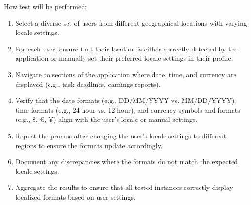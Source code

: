 \documentclass[12pt, titlepage]{article}
\begin{document}
\begin{enumerate}
How test will be performed:
\begin{enumerate}
    \item Select a diverse set of users from different geographical locations with varying locale settings.
    \item For each user, ensure that their location is either correctly detected by the application or manually set their preferred locale settings in their profile.
    \item Navigate to sections of the application where date, time, and currency are displayed (e.g., task deadlines, earnings reports).
    \item Verify that the date formats (e.g., DD/MM/YYYY vs. MM/DD/YYYY), time formats (e.g., 24-hour vs. 12-hour), and currency symbols and formats (e.g., \$, €, ¥) align with the user's locale or manual settings.
    \item Repeat the process after changing the user's locale settings to different regions to ensure the formats update accordingly.
    \item Document any discrepancies where the formats do not match the expected locale settings.
    \item Aggregate the results to ensure that all tested instances correctly display localized formats based on user settings.
\end{enumerate}

\end{enumerate}

\end{document}
